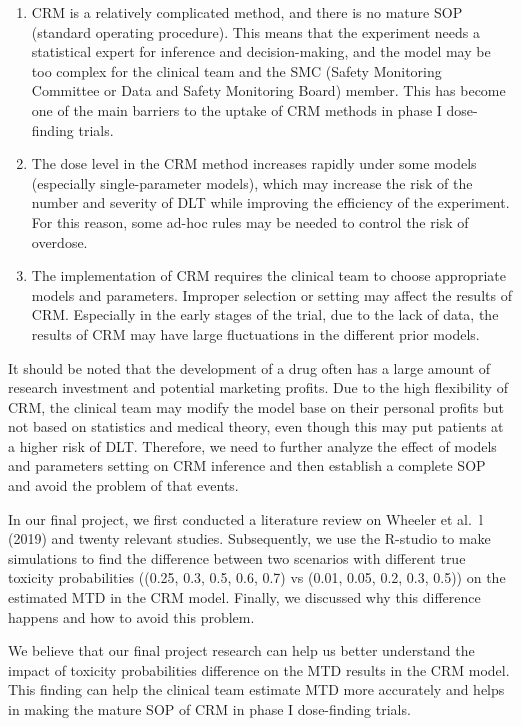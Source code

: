 \documentclass[
]{article}
\begin{document}
\begin{enumerate}
\def\labelenumi{\alph{enumi}.}
\item
  CRM is a relatively complicated method, and there is no mature SOP
  (standard operating procedure). This means that the experiment needs a
  statistical expert for inference and decision-making, and the model
  may be too complex for the clinical team and the SMC (Safety
  Monitoring Committee or Data and Safety Monitoring Board) member. This
  has become one of the main barriers to the uptake of CRM methods in
  phase I dose-finding trials.
\item
  The dose level in the CRM method increases rapidly under some models
  (especially single-parameter models), which may increase the risk of
  the number and severity of DLT while improving the efficiency of the
  experiment. For this reason, some ad-hoc rules may be needed to
  control the risk of overdose.
\item
  The implementation of CRM requires the clinical team to choose
  appropriate models and parameters. Improper selection or setting may
  affect the results of CRM. Especially in the early stages of the
  trial, due to the lack of data, the results of CRM may have large
  fluctuations in the different prior models.
\end{enumerate}

It should be noted that the development of a drug often has a large
amount of research investment and potential marketing profits. Due to
the high flexibility of CRM, the clinical team may modify the model base
on their personal profits but not based on statistics and medical
theory, even though this may put patients at a higher risk of DLT.
Therefore, we need to further analyze the effect of models and
parameters setting on CRM inference and then establish a complete SOP
and avoid the problem of that events.

In our final project, we first conducted a literature review on Wheeler
et al.~l (2019) and twenty relevant studies. Subsequently, we use the
R-studio to make simulations to find the difference between two
scenarios with different true toxicity probabilities ((0.25, 0.3, 0.5,
0.6, 0.7) vs (0.01, 0.05, 0.2, 0.3, 0.5)) on the estimated MTD in the
CRM model. Finally, we discussed why this difference happens and how to
avoid this problem.

We believe that our final project research can help us better understand
the impact of toxicity probabilities difference on the MTD results in
the CRM model. This finding can help the clinical team estimate MTD more
accurately and helps in making the mature SOP of CRM in phase I
dose-finding trials.
\end{document}
